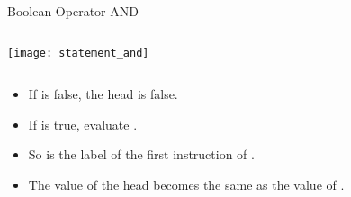 \begin{bibunit}[apalike]
\begin{frame}{Boolean Operator AND}
	\begin{columns}
		\begin{column}{.45\linewidth}
			\texttt{[image: statement\_and]}
		\end{column}
		\begin{column}{.55\linewidth}
			\begin{footnotesize}
			\begin{sdd}
			\end{sdd}
			\end{footnotesize}
		\end{column}
	\end{columns}
	\vfill
	\begin{itemize}
	\item If  is false, the head is false.
	\item If  is true, evaluate .
	\item So  is the label of the first instruction of .
	\item The value of the head becomes the same as the value of .
	\end{itemize}
\end{frame}


\end{bibunit}
